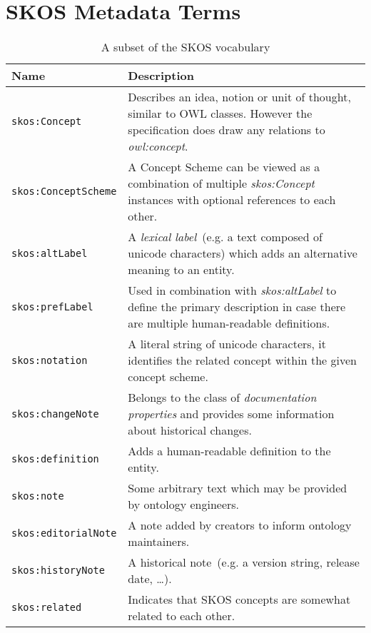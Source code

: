 \chapter{SKOS Metadata Terms}\label{app:skos_terms}
\begingroup
\renewcommand{\arraystretch}{2}
\begin{table}
	\begin{tabularx}{\textwidth}{l|X}
		\textbf{Name} & \textbf{Description} \\
		\hline
		\texttt{skos:Concept} & Describes an idea, notion or unit of thought, similar to OWL classes. However the specification does draw any relations to \textit{owl:concept}.\\
		\texttt{skos:ConceptScheme} & A Concept Scheme can be viewed as a combination of multiple \textit{skos:Concept} instances with optional references to each other.\\
		\texttt{skos:altLabel} & A \textit{lexical label}~(e.g. a text composed of unicode characters) which adds an alternative meaning to an entity. \\
		\texttt{skos:prefLabel} & Used in combination with \textit{skos:altLabel} to define the primary description in case there are multiple human-readable definitions.\\
		\texttt{skos:notation} & A literal string of unicode characters, it identifies the related concept within the given concept scheme.\\
		\texttt{skos:changeNote} & Belongs to the class of \textit{documentation properties} and provides some information about historical changes.\\
		\texttt{skos:definition} & Adds a human-readable definition to the entity.\\
		\texttt{skos:note} & Some arbitrary text which may be provided by ontology engineers.\\
		\texttt{skos:editorialNote} & A note added by creators to inform ontology maintainers.\\
		\texttt{skos:historyNote} & A historical note~(e.g. a version string, release date, \ldots ).\\
        \texttt{skos:related} & Indicates that SKOS concepts are somewhat related to each other.\\
	\end{tabularx}
	\caption{A subset of the SKOS vocabulary}
\end{table}
\endgroup

